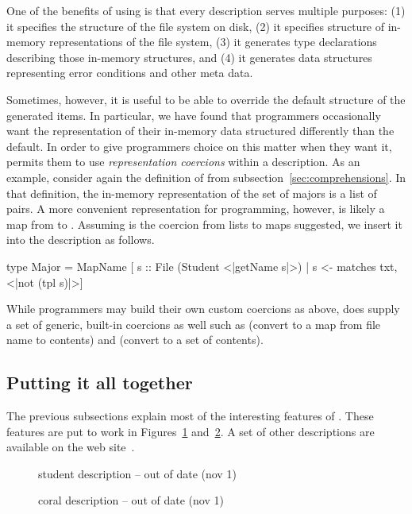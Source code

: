 One of the benefits of using \forest{} is that every description serves multiple purposes:
(1) it specifies the structure of the file system on disk, (2) it specifies structure of in-memory
representations of the file system, (3) it generates type declarations describing those in-memory
structures, and (4) it generates data structures representing error conditions and other meta data.

Sometimes, however, it is useful to be able to override the default structure of the generated items.
In particular, we have found that programmers occasionally want the representation of their in-memory data
structured differently than the default.  In order to give programmers choice on this matter when they want it,
\forest{} permits them to use {\em representation coercions} within a description.  As an example, consider
again the definition of  from subsection~\ref{sec:comprehensions}.  In that definition, the
in-memory representation of the set of majors is a list of  pairs.  A more convenient
representation for programming, however, is likely a map from  to .  Assuming
 is the coercion from lists to maps suggested, 
we insert it into the description as follows.
\begin{code}
type Major = 
  MapName [ s :: File (Student <|getName s|>) 
          | s <- matches txt, <|not (tpl s)|>]
\end{code}
While programmers may build their own custom coercions as above, \forest{} does supply a set of 
generic, built-in coercions as well such as  (convert to a map from file name to contents)
and  (convert to a set of contents).

\subsection{Putting it all together}

The previous subsections explain most of the interesting features of \forest{}.
These features are put to work in Figures~\ref{fig:student-description}
and~\ref{fig:coral-description}.  A set of other descriptions are available on 
the \forest{} web site~\cite{forest-web-site}.

\begin{figure}

\caption{\forest{} student description -- out of date (nov 1)}
\label{fig:student-description}
\end{figure}

\begin{figure}

\caption{\forest{} coral description -- out of date (nov 1)}
\label{fig:coral-description}
\end{figure}
